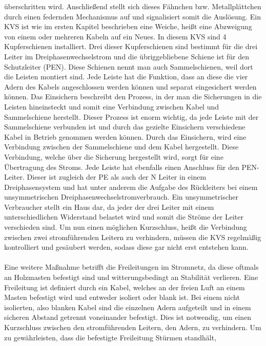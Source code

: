 überschritten wird. Anschließend stellt sich dieses Fähnchen bzw. Metallplättchen durch einen federnden Mechanismus auf und signalisiert somit die Auslösung. 
Ein KVS ist wie im ersten Kapitel beschrieben eine Weiche, heißt eine Abzweigung von einem oder mehreren Kabeln auf ein Neues. In diesem KVS sind 
4 Kupferschienen installiert. Drei dieser Kupferschienen sind bestimmt für die drei Leiter im Dreiphasenwechselstrom und die übriggebliebene Schiene ist 
für den Schutzleiter (PEN). Diese Schienen nennt man auch Sammelschienen, weil dort die Leisten montiert sind. Jede Leiste hat die Funktion,
dass an diese die vier Adern des Kabels angeschlossen werden können und separat eingesichert werden können. Das Einsichern beschreibt den Prozess, in der 
man die Sicherungen in die Leisten hineinsteckt und somit eine Verbindung zwischen Kabel und Sammelschiene herstellt. Dieser Prozess ist enorm wichtig, da 
jede Leiste mit der Sammelschiene verbunden ist und durch das gezielte Einsichern verschiedene Kabel in Betrieb genommen werden können. Durch das Einsichern,
wird eine Verbindung zwischen der Sammelschiene und dem Kabel hergestellt. Diese Verbindung, welche über die Sicherung hergestellt wird, sorgt für eine 
Übertragung des Stroms. Jede Leiste hat ebenfalls einen Anschluss für den PEN-Leiter. Dieser ist zugleich der PE als auch der N Leiter in einem 
Dreiphasensystem und hat unter anderem die Aufgabe des Rückleiters bei einem unsymmetrischen Dreiphasenwechselstromverbrauch. Ein unsymmetrischer 
Verbraucher stellt \zB ein Haus dar, da jeder der drei Leiter mit einem unterschiedlichen Widerstand belastet wird und somit die Ströme der Leiter verschieden 
sind. Um nun einen möglichen Kurzschluss, heißt die Verbindung zwischen zwei stromführenden Leitern zu verhindern, müssen die KVS regelmäßig kontrolliert und 
gesäubert werden, sodass diese gar nicht erst entstehen kann. \autocite{Weigerber.2013}
\\\\ 
Eine weitere Maßnahme betrifft die Freileitungen im Stromnetz, da diese oftmals an Holzmasten befestigt sind und witterungsbedingt an Stabilität verlieren. 
Eine Freileitung ist definiert durch ein Kabel, welches an der freien Luft an einem Masten befestigt wird und entweder isoliert oder blank ist. Bei einem 
nicht isolierten, also blanken Kabel sind die einzelnen Adern aufgeteilt und in einem sicheren Abstand getrennt voneinander befestigt. Dies ist notwendig, 
um einen Kurzschluss zwischen den stromführenden Leitern, den Adern, zu verhindern. Um zu gewährleisten, dass die befestigte Freileitung Stürmen standhält,
